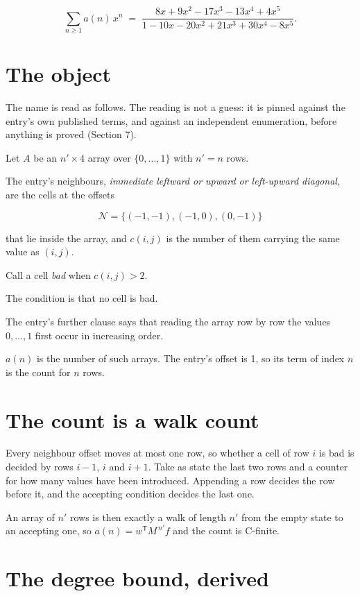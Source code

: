\documentclass[11pt]{article}
\theoremstyle{definition}
\begin{document}
\[\sum_{n \ge 1} a(n)\,x^n \;=\; \frac{8x + 9x^{2} - 17x^{3} - 13x^{4} + 4x^{5}}{1 - 10x - 20x^{2} + 21x^{3} + 30x^{4} - 8x^{5}}.\]

\section{The object}

The name is read as follows. The reading is not a guess: it is pinned against the entry's own published terms, and against an independent enumeration, before anything is proved (Section 7).

Let $A$ be an $n' \times 4$ array over $\{0,\dots,1\}$ with $n' = n$ rows.

The entry's neighbours, {\itshape immediate leftward or upward or left-upward diagonal}, are the cells at the offsets

\[\mathcal{N} = \{(-1,-1), (-1,0), (0,-1)\}\]

that lie inside the array, and $c(i,j)$ is the number of them carrying the same value as $(i,j)$.

Call a cell {\itshape bad} when $c(i,j) > 2$.

The condition is that no cell is bad.

The entry's further clause says that reading the array row by row the values $0,\dots,1$ first occur in increasing order.

$a(n)$ is the number of such arrays. The entry's offset is 1, so its term of index $n$ is the count for $n$ rows.

\section{The count is a walk count}

Every neighbour offset moves at most one row, so whether a cell of row $i$ is bad is decided by rows $i-1$, $i$ and $i+1$. Take as state the last two rows and a counter for how many values have been introduced. Appending a row decides the row before it, and the accepting condition decides the last one.

An array of $n'$ rows is then exactly a walk of length $n'$ from the empty state to an accepting one, so $a(n) = w^{\mathsf T}M^{\,n'}f$ and the count is C-finite.

\section{The degree bound, derived}
\end{document}
